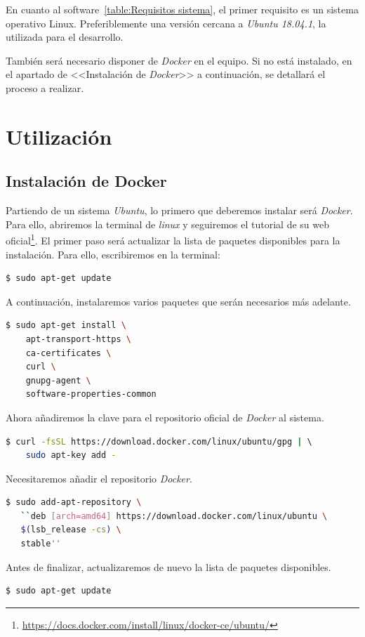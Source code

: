 En cuanto al software~\ref{table:Requisitos sistema}, el primer requisito es un sistema operativo Linux. Preferiblemente una versión cercana a \textit{Ubuntu 18.04.1}, la utilizada para el desarrollo.

También será necesario disponer de \textit{Docker} en el equipo. Si no está instalado, en el apartado de <<Instalación de \textit{Docker}>> a continuación, se detallará el proceso a realizar.

\section{Utilización}
\subsection{Instalación de Docker}
Partiendo de un sistema \textit{Ubuntu}, lo primero que deberemos instalar será \textit{Docker}. Para ello, abriremos la terminal de \textit{linux} y seguiremos el tutorial de su web oficial\footnote{\url{https://docs.docker.com/install/linux/docker-ce/ubuntu/}}. El primer paso será actualizar la lista de paquetes disponibles para la instalación. Para ello, escribiremos en la terminal:
    \begin{lstlisting}[language=bash]
    $ sudo apt-get update
    \end{lstlisting}
A continuación, instalaremos varios paquetes que serán necesarios más adelante.
    \begin{lstlisting}[language=bash]
    $ sudo apt-get install \
    apt-transport-https \
    ca-certificates \
    curl \
    gnupg-agent \
    software-properties-common
    \end{lstlisting}
Ahora añadiremos la clave para el repositorio oficial de \textit{Docker} al sistema.
    \begin{lstlisting}[language=bash]
    $ curl -fsSL https://download.docker.com/linux/ubuntu/gpg | \ 
    sudo apt-key add -
    \end{lstlisting}
Necesitaremos añadir el repositorio \textit{Docker}.
    \begin{lstlisting}[language=bash]
    $ sudo add-apt-repository \
   ``deb [arch=amd64] https://download.docker.com/linux/ubuntu \
   $(lsb_release -cs) \
   stable''
    \end{lstlisting}
Antes de finalizar, actualizaremos de nuevo la lista de paquetes disponibles.
    \begin{lstlisting}[language=bash]
    $ sudo apt-get update
    \end{lstlisting}
